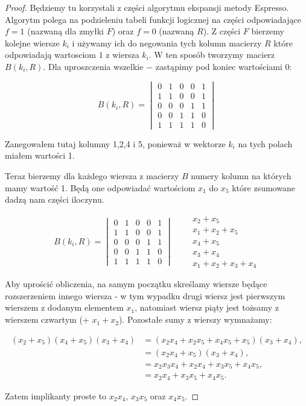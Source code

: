 \documentclass[11pt]{article}
\theoremstyle{definition}
\begin{document}
\begin{proof}
Będziemy tu korzystali z części algorytmu ekspansji metody Espresso. Algorytm polega na podzieleniu tabeli funkcji logicznej na części odpowiadające $f=1$ (nazwaną dla zmyłki $F$) oraz $f=0$ (nazwaną $R$). Z części $F$ bierzemy kolejne wiersze $k_i$ i używamy ich do negowania tych kolumn macierzy $R$ które odpowiadają wartosciom $1$ z wiersza $k_i$. W ten sposób tworzymy macierz $B(k_i, R)$. Dla uproszczenia wszelkie $-$ zastąpimy pod koniec wartościami $0$:

$$B(k_i, R) = 
\begin{vmatrix}
0&1&0&0&1 \\
1&1&0&0&1 \\
0&0&0&1&1 \\
0&0&1&1&0 \\
1&1&1&1&0
\end{vmatrix}
$$

Zanegowałem tutaj kolumny 1,2,4 i 5, ponieważ w wektorze $k_i$ na tych polach miałem wartości 1.

Teraz bierzemy dla każdego wiersza z macierzy $B$ numery kolumn na których mamy wartość 1. Będą one odpowiadać wartościom $x_1$ do $x_5$ które zsumowane dadzą nam części iloczynu.


$$B(k_i, R) = 
\begin{vmatrix}
0&1&0&0&1 \\
1&1&0&0&1 \\
0&0&0&1&1 \\
0&0&1&1&0 \\
1&1&1&1&0
\end{vmatrix} \qquad \begin{matrix} x_2+x_5\\x_1+x_2+x_5\\x_4+x_5\\x_3+x_4\\x_1+x_2+x_3+x_4\end{matrix}
$$

Aby uprościć obliczenia, na samym początku skreślamy wiersze będące rozszerzeniem innego wiersza - w tym wypadku drugi wiersz jest pierwszym wierszem z dodanym elementem $x_1$, natomiast wiersz piąty jest tożsamy z wierszem czwartym (+ $x_1+x_2$). Pozostałe sumy z wierszy wymnażamy:

\begin{align*}
(x_2+x_5)(x_4+x_5)(x_3+x_4) &= (x_2x_4 + x_2x_5+x_4x_5 + x_5)(x_3+x_4),\\
 &= (x_2x_4 + x_5)(x_3+x_4),\\
 &= x_2x_3x_4 + x_2x_4 + x_3x_5 + x_4x_5,\\
 &= x_2x_4 + x_3x_5 + x_4x_5.
\end{align*}

Zatem implikanty proste to $x_2x_4$, $x_3x_5$ oraz $x_4x_5$.


\end{proof}
\end{document}
